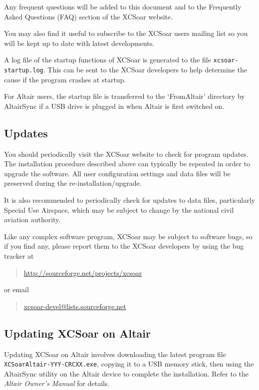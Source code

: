 \documentclass[a4paper,12pt]{refrep}
\begin{document}
Any frequent questions will be added to this document and to the Frequently
Asked Questions (FAQ) section of the XCSoar website.

You may also find it useful to subscribe to the XCSoar users mailing
list so you will be kept up to date with latest developments.

A log file of the startup functions of XCSoar is generated to the file
\verb|xcsoar-startup.log|.  This can be sent to the XCSoar developers
to help determine the cause if the program crashes at startup.

For Altair users, the startup file is transferred to the `FromAltair'
directory by AltairSync if a USB drive is plugged in when Altair is
first switched on.

\subsection*{Updates}

You should periodically visit the XCSoar website to check for program
updates.  The installation procedure described above can typically be
repeated in order to upgrade the software.  All user configuration
settings and data files will be preserved during the
re-installation/upgrade.

It is also recommended to periodically check for updates to data
files, particularly Special Use Airspace, which may be subject to
change by the national civil aviation authority.

Like any complex software program, XCSoar may be subject to software
bugs, so if you find any, please report them to the XCSoar developers
by using the bug tracker at 
\begin{quote}
\url{http://sourceforge.net/projects/xcsoar}
\end{quote}
or email
\begin{quote}
\url{xcsoar-devel@lists.sourceforge.net}
\end{quote} 

\subsection*{Updating XCSoar on Altair}

Updating XCSoar on Altair involves downloading the latest program file
{\tt XCSoarAltair-YYY-CRCXX.exe}, copying it to a USB memory stick,
then using the AltairSync utility on the Altair device to complete the
installation.  Refer to the {\em Altair Owner's Manual} for details.
\end{document}
